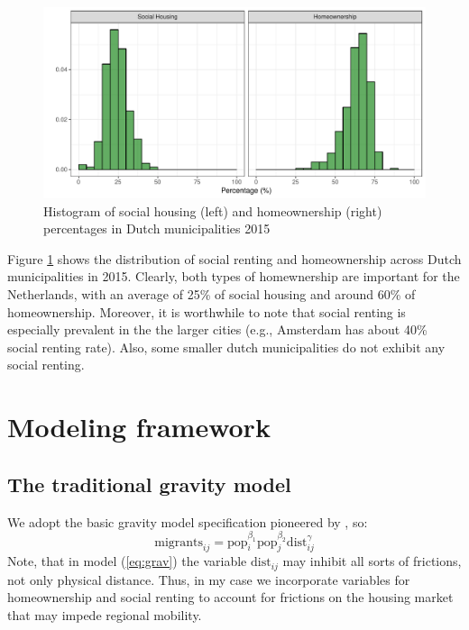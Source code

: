 \documentclass[fleqn,10pt]{SelfArx} %
\begin{document}
        \begin{figure}[ht]\centering %
          \includegraphics[width=0.8\linewidth]{../fig/hist_housing.pdf}
          \caption{Histogram of social housing (left) and
            homeownership (right) percentages in Dutch municipalities
            2015}
            \label{fig:housing_mig}
        \end{figure}

        Figure \ref{fig:housing_mig} shows the distribution of social
        renting and homeownership across Dutch municipalities in 2015.
        Clearly, both types of homewnership are important for the
        Netherlands, with an average of 25\% of social housing and
        around 60\% of homeownership. Moreover, it is worthwhile to
        note that social renting is especially prevalent in the the
        larger cities (e.g., Amsterdam has about 40\% social renting
        rate). Also, some smaller dutch municipalities do not exhibit
        any social renting.
        
        \section{Modeling framework}

        \subsection{The traditional gravity model}

        We adopt the basic gravity model specification pioneered by
        \citet{tinbergen1962shaping}, so:
        \begin{equation}
          \text{migrants}_{ij} = \text{pop}_i^{\beta_1}\text{pop}_j^{\beta_2}\text{dist}_{ij}^\gamma
          \label{eq:grav}
        \end{equation}
        Note, that in model (\ref{eq:grav}) the variable
        $\text{dist}_{ij}$ may inhibit all sorts of frictions, not
        only physical distance. Thus, in my case we incorporate
        variables for homeownership and social renting to account for
        frictions on the housing market that may impede regional
        mobility.
\end{document}
